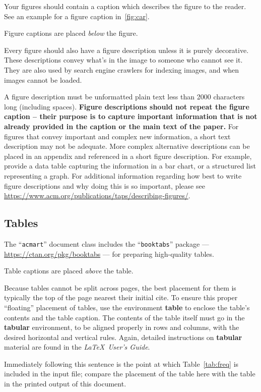 \documentclass[sigchi]{acmart}
\begin{document}
Your figures should contain a caption which describes the figure to
the reader. See an example for a figure caption in~\ref{fig:car}.

Figure captions are placed {\itshape below} the figure.

Every figure should also have a figure description unless it is purely
decorative. These descriptions convey what’s in the image to someone
who cannot see it. They are also used by search engine crawlers for
indexing images, and when images cannot be loaded.

A figure description must be unformatted plain text less than 2000
characters long (including spaces).  {\bfseries Figure descriptions
  should not repeat the figure caption – their purpose is to capture
  important information that is not already provided in the caption or
  the main text of the paper.} For figures that convey important and
complex new information, a short text description may not be
adequate. More complex alternative descriptions can be placed in an
appendix and referenced in a short figure description. For example,
provide a data table capturing the information in a bar chart, or a
structured list representing a graph.  For additional information
regarding how best to write figure descriptions and why doing this is
so important, please see
\url{https://www.acm.org/publications/taps/describing-figures/}.

\subsection{Tables}

The ``\verb|acmart|'' document class includes the ``\verb|booktabs|''
package --- \url{https://ctan.org/pkg/booktabs} --- for preparing
high-quality tables.

Table captions are placed {\itshape above} the table.

Because tables cannot be split across pages, the best placement for
them is typically the top of the page nearest their initial cite.  To
ensure this proper ``floating'' placement of tables, use the
environment \textbf{table} to enclose the table's contents and the
table caption.  The contents of the table itself must go in the
\textbf{tabular} environment, to be aligned properly in rows and
columns, with the desired horizontal and vertical rules.  Again,
detailed instructions on \textbf{tabular} material are found in the
\textit{\LaTeX\ User's Guide}.

Immediately following this sentence is the point at which
Table~\ref{tab:freq} is included in the input file; compare the
placement of the table here with the table in the printed output of
this document.
\end{document}
